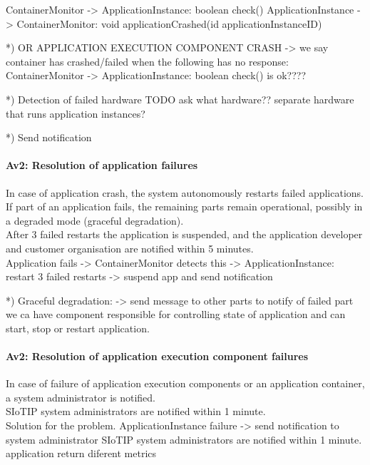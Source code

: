         ContainerMonitor -> ApplicationInstance: boolean check()
        ApplicationInstance -> ContainerMonitor: void applicationCrashed(id applicationInstanceID)

        *) OR APPLICATION EXECUTION COMPONENT CRASH
        -> we say container has crashed/failed when the following has no response:
        ContainerMonitor -> ApplicationInstance: boolean check()
        is ok????

        *) Detection of failed hardware
        TODO ask what hardware?? separate hardware that runs application instances?

        *) Send notification

    \paragraph{Av2: Resolution of application failures}
        In case of application crash, the system autonomously restarts failed applications.
        If part of an application fails, the remaining parts remain operational,
        possibly in a degraded mode (graceful degradation). \\
        After 3 failed restarts the application is suspended, and the
        application developer and customer organisation are notified within 5 minutes.\\
        Application fails -> ContainerMonitor detects this -> ApplicationInstance: restart
        3 failed restarts -> suspend app and send notification

        *) Graceful degradation:
        -> send message to other parts to notify of failed part
        we ca have component responsible for controlling state of application
        and can start, stop or restart application.



    \paragraph{Av2: Resolution of application execution component failures}
        In case of failure of application execution components or an application
        container, a system administrator is notified. \\
        SIoTIP system administrators are notified within 1 minute.\\
        Solution for the problem.
        ApplicationInstance failure -> send notification to system administrator
        SIoTIP system administrators are notified within 1 minute.
        application return diferent metrics

